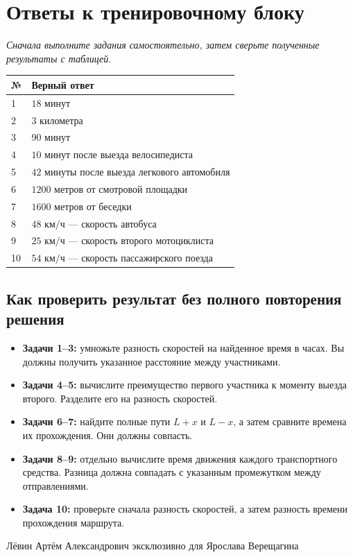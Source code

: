 \documentclass[a4paper,12pt]{article}
\newcommand{\topic}[1]{\section*{\color{darkaccent}#1}}
\newcommand{\subtopic}[1]{\subsection*{\color{accent}#1}}
\newcommand{\kmh}{\text{ км/ч}}
\begin{document}
\clearpage
\topic{Ответы к тренировочному блоку}
\textit{Сначала выполните задания самостоятельно, затем сверьте полученные результаты с таблицей.}
\vspace{5mm}
\begin{center}
\renewcommand{\arraystretch}{1.5}
\begin{tabularx}{0.86\linewidth}{@{}p{15mm}X@{}}
\toprule
№ & Верный ответ \\
\midrule
1 & $18$ минут \\
2 & $3$ километра \\
3 & $90$ минут \\
4 & $10$ минут после выезда велосипедиста \\
5 & $42$ минуты после выезда легкового автомобиля \\
6 & $1200$ метров от смотровой площадки \\
7 & $1600$ метров от беседки \\
8 & $48\kmh$ --- скорость автобуса \\
9 & $25\kmh$ --- скорость второго мотоциклиста \\
10 & $54\kmh$ --- скорость пассажирского поезда \\
\bottomrule
\end{tabularx}
\end{center}
\vspace{8mm}
\subtopic{Как проверить результат без полного повторения решения}
\begin{itemize}
\item \textbf{Задачи 1--3:} умножьте разность скоростей на найденное время в часах. Вы должны получить указанное расстояние между участниками.
\item \textbf{Задачи 4--5:} вычислите преимущество первого участника к моменту выезда второго. Разделите его на разность скоростей.
\item \textbf{Задачи 6--7:} найдите полные пути $L+x$ и $L-x$, а затем сравните времена их прохождения. Они должны совпасть.
\item \textbf{Задачи 8--9:} отдельно вычислите время движения каждого транспортного средства. Разница должна совпадать с указанным промежутком между отправлениями.
\item \textbf{Задача 10:} проверьте сначала разность скоростей, а затем разность времени прохождения маршрута.
\end{itemize}
\vfill
\begin{center}\small\color{mute}Лёвин Артём Александрович эксклюзивно для Ярослава Верещагина\end{center}
\end{document}
